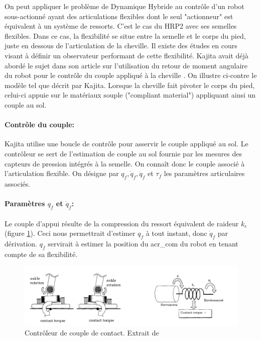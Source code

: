 \documentclass{report}
\begin{document}
On peut appliquer le problème de Dynamique Hybride au contrôle d'un robot sous-actionné ayant des articulations flexibles dont le seul "actionneur" est équivalent à un système de ressorts. C'est le cas du HRP2 avec ses semelles flexibles. Dans ce cas, la flexibilité se situe entre la semelle et le corps du pied, juste en dessous de l'articulation de la cheville. Il existe des études en cours visant à définir un observateur performant de cette flexibilité. Kajita avait déjà abordé le sujet dans son article sur l'utilisation du retour de moment angulaire du robot pour le contrôle du couple appliqué à la cheville \cite{bib_backdrive}. On illustre ci-contre le modèle tel que décrit par Kajita. Lorsque la cheville fait pivoter le corps du pied, celui-ci appuie sur le matériaux souple ("compliant material") appliquant ainsi un couple au sol.
\paragraph{Contrôle du couple:} Kajita utilise une boucle de contrôle pour asservir le couple appliqué au sol. Le contrôleur se sert de l'estimation de couple au sol fournie par les mesures des capteurs de pression intégrés à la semelle. On connaît donc le couple associé à l'articulation flexible. On désigne par $q_f, \dot{q}_f, \ddot{q}_f$ et $\tau_f$ les paramètres articulaires associés.
\paragraph{Paramètres $q_f$ et $\dot{q}_f$:} Le couple d'appui résulte de la compression du ressort équivalent de raideur $k_e$ (figure \ref{fig_hrp2ankle}). Ceci nous permettrait d'estimer $q_f$ à tout instant, donc $\dot{q}_f$ par dérivation. $q_f$ servirait à estimer la position du \gls{acr_com} du robot en tenant compte de sa flexibilité.

\begin{figure}[H]
  \centering
  \includegraphics[width=\textwidth]{figs/contactTorque.png}
  \caption{Contrôleur de couple de contact. Extrait de \cite[figure 2,3]{bib_backdrive}}
  \label{fig_hrp2ankle}
\end{figure}
\end{document}
